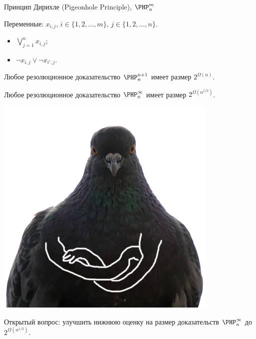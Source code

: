 \begin{frame}{Принцип Дирихле (Pigeonhole Principle), $\PHP_{n}^{m}$}

    Переменные: $x_{i, j}$, $i \in \{1, 2, \dots, m\}$, $j \in \{1, 2, \dots, n\}$.
    \vspace{0.1cm}

    \pause
    \begin{itemize}
        \item $\bigvee\limits_{j = 1}^{n} x_{i, j}$;
        \item $\neg x_{i, j} \lor \neg x_{i', j}$.
    \end{itemize}

    \pause

    \vspace{0.2cm}
    \begin{minipage}{0.3\linewidth}
        \centering
        
    \end{minipage}
    \pause
    \begin{minipage}{0.68\linewidth}
        \begin{theorem}[Haken 85]
            Любое резолюционное доказательство $\PHP_{n}^{n + 1}$ имеет размер $2^{\Omega(n)}$. 
        \end{theorem}
        \pause
        \begin{theorem}
            Любое резолюционное доказательство $\PHP_{n}^{\infty}$ имеет размер $2^{\Omega(n^{1 / 3})}$.
        \end{theorem}
        \pause
        \begin{minipage}{0.3\linewidth}
            \centering
            \includegraphics[width = 0.8\textwidth]{pics/pigeon3.png}
        \end{minipage}
        \begin{minipage}{0.67\linewidth}
            Открытый вопрос: улучшить нижнюю оценку на размер доказательств $\PHP_{n}^{\infty}$ до
            $2^{\Omega(n^{1 / 2})}$.
        \end{minipage}
    \end{minipage}
    
\end{frame}